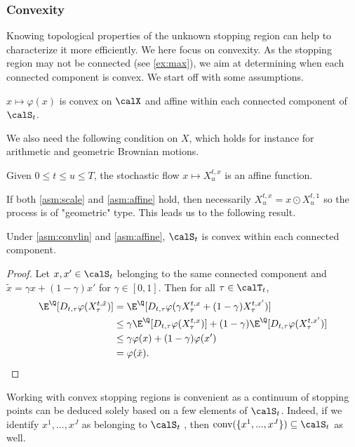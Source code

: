 \subsubsection{Convexity}
Knowing topological properties of the unknown stopping region can help to characterize it more efficiently. We here focus on convexity. As the stopping region may not be connected (see \cref{ex:max}), we aim at determining when each connected component is convex.  We start off with some assumptions. 

\begin{asm}\label{asm:convlin}
$x \mapsto \varphi(x)$ is convex on $\calX$ and affine within each connected component of  $\calS_t$. 
\end{asm}

We also need the following condition on $X$, which holds for instance for arithmetic and geometric Brownian motions. 
\begin{asm} \label{asm:affine}
    Given $0\le t \le u \le T$, the stochastic flow $x \mapsto X_u^{t,x}$  is an affine function.
\end{asm}

If both \cref{asm:scale} and  \ref{asm:affine}  hold, then necessarily $X_u^{t,x} = x \odot X_u^{t,\mathds{1}}$ so  the process is of "geometric" type. This leads us to the following result. 

\begin{proposition}
Under \cref{asm:convlin} and \ref{asm:affine}, $\calS_t$ is convex within each connected component.
\end{proposition}

\begin{proof}
Let $x,x'\in \calS_t$ belonging to the same connected component and  $\tilde{x}=\gamma x + (1-\gamma)x'$ for $\gamma \in [0,1]$. Then for all $\tau \in \calT_t$,
\begin{align*}
\E^{\Q}[D_{t,\tau}\varphi(X^{t,\tilde{x}}_\tau)] &=%
\E^{\Q}[D_{t,\tau} \varphi(\gamma X^{t,x}_\tau + (1-\gamma) X^{t,x'}_\tau)]\\
    &\leq%
    \gamma \E^{\Q}[D_{t,\tau}\varphi(X^{t,x}_\tau)]
    +
    (1-\gamma)\E^{\Q}[D_{t,\tau}\varphi(X^{t,x'}_\tau)]\\
    &\leq \gamma \varphi(x) + (1-\gamma) \varphi(x')\\
    &= %
    \varphi(\tilde{x}).
\end{align*}
\end{proof}
Working with convex stopping regions is convenient as a continuum of stopping points can be deduced solely based on a few elements of $\calS_t$. Indeed, if we identify $x^{1},...,x^{J}$ as belonging to  $\calS_t$ %
, then   $\text{conv}(\{x^{1},...,x^{J}\}) \subseteq \calS_t$ as well.
